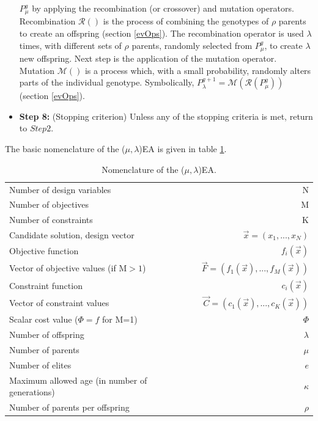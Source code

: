 \begin{itemize}
$P_{\mu}^{g}$  by applying the recombination (or crossover) and mutation operators. Recombination $\mathcal{R}()$ is the process of combining the genotypes of $\rho$ parents to create an offspring (section \ref{evOps}). The recombination operator is used $\lambda$ times, with different sets of $\rho$ parents, randomly selected from $P_{\mu}^{g}$,  to create $\lambda$ new offspring. Next step is the application of the mutation operator. Mutation $\mathcal{M}()$ is a process which, with a small probability, randomly alters parts of the individual genotype. Symbolically, $P_{\lambda}^{g+1} = \mathcal{M}(\mathcal{R}(P_{\mu}^{g}))$ (section \ref{evOps}).
\item[]{\bf Step 8:}  (Stopping criterion) Unless any of the stopping criteria is met, return to $Step 2$.
\end{itemize}

The basic nomenclature of the ($\mu,\lambda$)EA is given in table \ref{GEA nomenclature}. 

\begin{table}[h!]
\centering
\begin{tabular}{lr} 
\hline
\hline
Number of design variables & N\\
Number of objectives & M\\
Number of constraints   & K\\
\hline
Candidate solution, design vector   & $\vec{x}=(x_1,...,x_N)$\\
Objective function &$f_i(\vec{x})$ \\
Vector of objective values (if M$>\!1$)  &$\vec{F}=(f_1(\vec{x}),...,f_M(\vec{x}))$\\
Constraint function &$c_i(\vec{x})$ \\
Vector of constraint values  & $\vec{C}=(c_1(\vec{x}),...,c_K(\vec{x}))$\\
Scalar cost value ($\Phi\!=\!f$ for M=1) & $\Phi$ \\
\hline
Number of offspring &   $\lambda$ 			\\
Number of parents &  $\mu$ 				\\
Number of elites &  $e$			\\
Maximum allowed age (in number of generations)&  $\kappa$			\\
Number of parents per offspring &  $\rho$			\\
\hline
\hline
\end{tabular}
\caption[GEA nomenclature]{Nomenclature of the ($\mu,\lambda$)EA.}
\label{GEA nomenclature} 
\end{table}
\FloatBarrier


